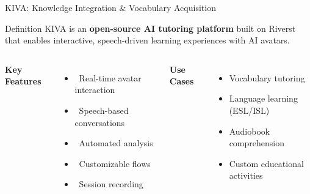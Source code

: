 \documentclass[aspectratio=169]{beamer}
\begin{document}
\begin{frame}{KIVA: Knowledge Integration \& Vocabulary Acquisition}
\begin{block}{Definition}
KIVA is an \textbf{open-source AI tutoring platform} built on Riverst that enables interactive, speech-driven learning experiences with AI avatars.
\end{block}

\vspace{0.5cm}

\begin{columns}[T]
\textbf{Key Features}
\begin{itemize}
    \item \faRobot\ Real-time avatar interaction
    \item \faMicrophone\ Speech-based conversations
    \item \faChartLine\ Automated analysis
    \item \faCogs\ Customizable flows
    \item \faDatabase\ Session recording
\end{itemize}

\textbf{Use Cases}
\begin{itemize}
    \item Vocabulary tutoring
    \item Language learning (ESL/ISL)
    \item Audiobook comprehension
    \item Custom educational activities
\end{itemize}
\end{columns}
\end{frame}
\end{document}

